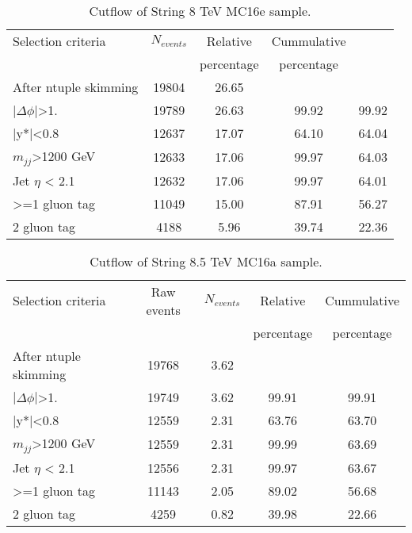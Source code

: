 \begin{table}[ht]
\begin{center}
\begin{tabular}{|l|c|c|c|c|}
\hline
Selection criteria & $N_{events}$ & Relative & Cummulative \\
 & & percentage & percentage \\
\hline
After ntuple skimming & 19804 & 26.65 &  &  \\
$|\Delta\phi|$>1. & 19789 & 26.63 & 99.92 & 99.92 \\
|y*|<0.8 & 12637 & 17.07 & 64.10 & 64.04 \\
$m_{jj}$>1200 GeV & 12633 & 17.06 & 99.97 & 64.03 \\
Jet $\eta$ < 2.1 & 12632 & 17.06 & 99.97 & 64.01 \\
>=1 gluon tag & 11049 & 15.00 & 87.91 & 56.27 \\
2 gluon tag & 4188 & 5.96 & 39.74 & 22.36 \\
\hline
\end{tabular}
\end{center}
\caption{Cutflow of String 8 TeV MC16e sample.}
\end{table}

\begin{table}[ht]
\begin{center}
\begin{tabular}{|l|c|c|c|c|}
\hline
Selection criteria & Raw events & $N_{events}$ & Relative & Cummulative \\
 & & & percentage & percentage \\
\hline
After ntuple skimming & 19768 & 3.62 &  &  \\
$|\Delta\phi|$>1. & 19749 & 3.62 & 99.91 & 99.91 \\
|y*|<0.8 & 12559 & 2.31 & 63.76 & 63.70 \\
$m_{jj}$>1200 GeV & 12559 & 2.31 & 99.99 & 63.69 \\
Jet $\eta$ < 2.1 & 12556 & 2.31 & 99.97 & 63.67 \\
>=1 gluon tag & 11143  & 2.05 & 89.02 & 56.68 \\
2 gluon tag & 4259 & 0.82 & 39.98 & 22.66 \\
\hline
\end{tabular}
\end{center}
\caption{Cutflow of String 8.5 TeV MC16a sample.}
\end{table}

